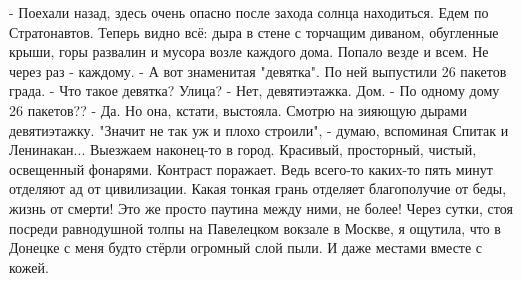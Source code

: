- Поехали назад, здесь очень опасно после захода солнца находиться.
Едем по Стратонавтов. Теперь видно всё: дыра в стене с торчащим диваном, обугленные крыши, горы развалин и мусора возле каждого дома. Попало везде и всем. Не через раз - каждому.
- А вот знаменитая "девятка". По ней выпустили 26 пакетов града.
- Что такое девятка? Улица?
- Нет, девятиэтажка. Дом.
- По одному дому 26 пакетов??
- Да. Но она, кстати, выстояла.
Смотрю на зияющую дырами девятиэтажку. "Значит не так уж и плохо строили", - думаю, вспоминая Спитак и Ленинакан...
Выезжаем наконец-то в город. Красивый, просторный, чистый, освещенный фонарями. Контраст поражает. Ведь всего-то каких-то пять минут отделяют ад от цивилизации. Какая тонкая грань отделяет благополучие от беды, жизнь от смерти! Это же просто паутина между ними, не более!
Через сутки, стоя посреди равнодушной толпы на Павелецком вокзале в Москве, я ощутила, что в Донецке с меня будто стёрли огромный слой пыли. И даже местами вместе с кожей.
